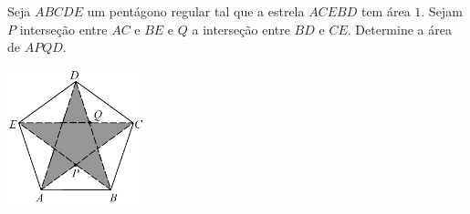 Seja $ABCDE$ um pentágono regular tal que a estrela $ACEBD$ tem área $1$. Sejam $P$ interseção entre
$AC$ e $BE$ e $Q$ a interseção entre $BD$ e $CE$. Determine a área de $APQD$.

\begin{center}
\includegraphics[width = 4cm]{figura.png}
\end{center}